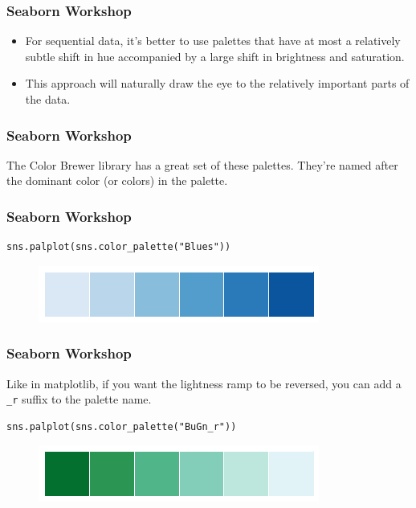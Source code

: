 \documentclass{beamer}
\begin{document}
\begin{frame}[fragile]
	\frametitle{Seaborn Workshop}
	\large
\begin{itemize}
\item For sequential data, it’s better to use palettes that have at most a relatively subtle shift in hue accompanied by a large shift in brightness and saturation. 
\item This approach will naturally draw the eye to the relatively important parts of the data.
\end{itemize}
\end{frame}
\begin{frame}[fragile]
\frametitle{Seaborn Workshop}
\large

The Color Brewer library has a great set of these palettes. They’re named after the dominant color (or colors) in the palette.

\end{frame}
\begin{frame}[fragile]
	\frametitle{Seaborn Workshop}
	\large
\begin{verbatim}
sns.palplot(sns.color_palette("Blues"))
\end{verbatim}

\begin{figure}
	\centering
	\includegraphics[width=0.7\linewidth]{images/color_palettes_25_0}
\end{figure}
\end{frame}
\begin{frame}[fragile]
	\frametitle{Seaborn Workshop}
	\large
	Like in matplotlib, if you want the lightness ramp to be reversed, you can add a \texttt{\_r} suffix to the palette name.
\begin{verbatim}
sns.palplot(sns.color_palette("BuGn_r"))
\end{verbatim}

\begin{figure}
	\centering
	\includegraphics[width=0.7\linewidth]{images/color_palettes_27_0}
\end{figure}


\end{frame}
\end{document}

